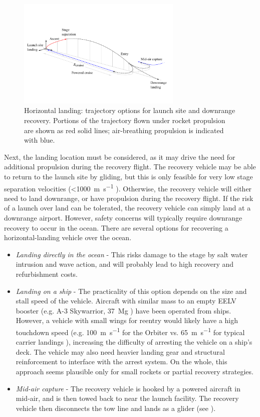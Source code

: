 \documentclass[conf]{new-aiaa}
\begin{document}
\begin{figure}[hbt!]
	\centering
	\includegraphics[width=0.7\textwidth]{figures/flyback_trajectory}
	\caption{\label{fig:flyback_trajectory} Horizontal landing: trajectory options for launch site and downrange recovery. Portions of the trajectory flown under rocket propulsion are shown as red solid lines; air-breathing propulsion is indicated with blue.}
\end{figure}

Next, the landing location must be considered, as it may drive the need for additional propulsion during the recovery flight. The recovery vehicle may be able to return to the launch site by gliding, but this is only feasible for very low stage separation velocities (<\SI{1000}{\meter\per\second} \cite{Hellman2005} \cite{Healy1998}). Otherwise, the recovery vehicle will either need to land downrange, or have propulsion during the recovery flight. If the risk of a launch over land can be tolerated, the recovery vehicle can simply land at a downrange airport. However, safety concerns will typically require downrange recovery to occur in the ocean. There are several options for recovering a horizontal-landing vehicle over the ocean.
 
 \begin{itemize}
 	\item \emph{Landing directly in the ocean} - This risks damage to the stage by salt water intrusion and wave action, and will probably lead to high recovery and refurbishment costs.
 	\item \emph{Landing on a ship} - The practicality of this option depends on the size and stall speed of the vehicle. Aircraft with similar mass to an empty EELV booster (e.g. A-3 Skywarrior, \SI{37}{\mega\gram} \cite{DouglasA3}) have been operated from ships. However, a vehicle with small wings for reentry would likely have a high touchdown speed (e.g. \SI{100}{\meter\per\second} for the Orbiter \cite{ShuttleLanding} vs. \SI{65}{\meter\per\second} for typical carrier landings \cite{Shen2013}), increasing the difficulty of arresting the vehicle on a ship's deck. The vehicle may also need heavier landing gear and structural reinforcement to interface with the arrest system. On the whole, this approach seems plausible only for small rockets or partial recovery strategies.
 	\item \emph{Mid-air capture} - The recovery vehicle is hooked by a powered aircraft in mid-air, and is then towed back to near the launch facility. The recovery vehicle then disconnects the tow line and lands as a glider (see \cite{Stappert2017}).
 \end{itemize}
\end{document}

